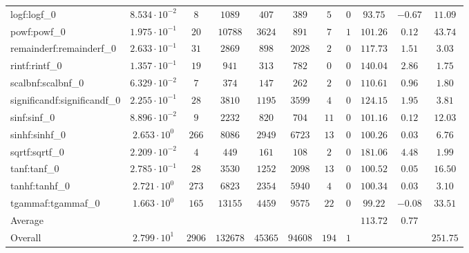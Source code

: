 \begin{tabular}{|l|c|c|c|c|c|c|c|c|c|c|}
logf:logf\_0                 & $ 8.534 \cdot 10^{-2} $ & $ 8      $ & $ 1089   $ & $ 407   $ & $ 389   $ & $ 5   $ & $ 0 $ & $ 93.75       $ & $ -0.67   $ & $ 11.09   $ \\
powf:powf\_0                 & $ 1.975 \cdot 10^{-1} $ & $ 20     $ & $ 10788  $ & $ 3624  $ & $ 891   $ & $ 7   $ & $ 1 $ & $ 101.26      $ & $ 0.12    $ & $ 43.74   $ \\
remainderf:remainderf\_0     & $ 2.633 \cdot 10^{-1} $ & $ 31     $ & $ 2869   $ & $ 898   $ & $ 2028  $ & $ 2   $ & $ 0 $ & $ 117.73      $ & $ 1.51    $ & $ 3.03    $ \\
rintf:rintf\_0               & $ 1.357 \cdot 10^{-1} $ & $ 19     $ & $ 941    $ & $ 313   $ & $ 782   $ & $ 0   $ & $ 0 $ & $ 140.04      $ & $ 2.86    $ & $ 1.75    $ \\
scalbnf:scalbnf\_0           & $ 6.329 \cdot 10^{-2} $ & $ 7      $ & $ 374    $ & $ 147   $ & $ 262   $ & $ 2   $ & $ 0 $ & $ 110.61      $ & $ 0.96    $ & $ 1.80    $ \\
significandf:significandf\_0 & $ 2.255 \cdot 10^{-1} $ & $ 28     $ & $ 3810   $ & $ 1195  $ & $ 3599  $ & $ 4   $ & $ 0 $ & $ 124.15      $ & $ 1.95    $ & $ 3.81    $ \\
sinf:sinf\_0                 & $ 8.896 \cdot 10^{-2} $ & $ 9      $ & $ 2232   $ & $ 820   $ & $ 704   $ & $ 11  $ & $ 0 $ & $ 101.16      $ & $ 0.12    $ & $ 12.03   $ \\
sinhf:sinhf\_0               & $ 2.653 \cdot 10^{0}  $ & $ 266    $ & $ 8086   $ & $ 2949  $ & $ 6723  $ & $ 13  $ & $ 0 $ & $ 100.26      $ & $ 0.03    $ & $ 6.76    $ \\
sqrtf:sqrtf\_0               & $ 2.209 \cdot 10^{-2} $ & $ 4      $ & $ 449    $ & $ 161   $ & $ 108   $ & $ 2   $ & $ 0 $ & $ 181.06      $ & $ 4.48    $ & $ 1.99    $ \\
tanf:tanf\_0                 & $ 2.785 \cdot 10^{-1} $ & $ 28     $ & $ 3530   $ & $ 1252  $ & $ 2098  $ & $ 13  $ & $ 0 $ & $ 100.52      $ & $ 0.05    $ & $ 16.50   $ \\
tanhf:tanhf\_0               & $ 2.721 \cdot 10^{0}  $ & $ 273    $ & $ 6823   $ & $ 2354  $ & $ 5940  $ & $ 4   $ & $ 0 $ & $ 100.34      $ & $ 0.03    $ & $ 3.10    $ \\
tgammaf:tgammaf\_0           & $ 1.663 \cdot 10^{0}  $ & $ 165    $ & $ 13155  $ & $ 4459  $ & $ 9575  $ & $ 22  $ & $ 0 $ & $ 99.22       $ & $ -0.08   $ & $ 33.51   $ \\
\hline
Average                      & $                     $ & $        $ & $        $ & $       $ & $       $ & $     $ & $   $ & $ 113.72      $ & $ 0.77    $ & $         $ \\
\hline
Overall                      & $ 2.799 \cdot 10^{1}  $ & $ 2906   $ & $ 132678 $ & $ 45365 $ & $ 94608 $ & $ 194 $ & $ 1 $ & $             $ & $         $ & $ 251.75  $ \\
\hline
\end{tabular}
